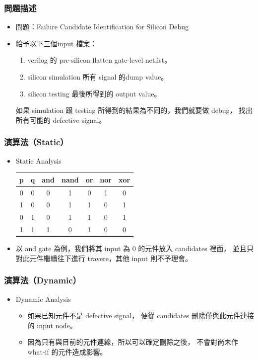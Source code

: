 \documentclass[dvipdfm]{beamer}
\begin{document}
\begin{frame}
\frametitle{問題描述}
\begin{itemize}
  \item 問題：Failure Candidate Identification for Silicon Debug
  \item 給予以下三個input 檔案：\\
    \begin{enumerate}
      \item verilog 的 pre-silicon flatten gate-level netlist。
      \item silicon simulation 所有 signal 的dump value。
      \item silicon testing 最後所得到的 output value。
    \end{enumerate}
    如果 simulation 跟 testing 所得到的結果為不同的，我們就要做 debug，
    找出所有可能的 defective signal。
\end{itemize}
\end{frame}

\begin{frame}
\frametitle{演算法（Static）}
\begin{itemize}
  \item Static Analysis\\
    \begin{tabular}{|c|c|c|c|c|c|c|}
      \hline
      p & q & and & nand & or & nor & xor\\
      \hline
      0 & 0 & 0   & 1    & 0  & 1   & 0\\
      \hline
      1 & 0 & 0   & 1    & 1  & 0   & 1\\
      \hline
      0 & 1 & 0   & 1    & 1  & 0   & 1\\
      \hline
      1 & 1 & 1   & 0    & 1  & 0   & 0\\
      \hline
    \end{tabular}
  \item 以 and gate 為例，我們將其 input 為 0 的元件放入 candidates 裡面，
    並且只對此元件繼續往下進行 travere，其他 input 則不予理會。
\end{itemize}
\end{frame}

\begin{frame}
\frametitle{演算法（Dynamic）}
\begin{itemize}
\item Dynamic Analysis\\
  \begin{itemize}
    \item 如果已知元件不是 defective signal，
      便從 candidates 刪除僅與此元件連接的 input node。
    \item 因為只有與目前的元件連線，所以可以確定刪除之後，
      不會對尚未作 what-if 的元件造成影響。
  \end{itemize}
\end{itemize}
\end{frame}
\end{document}
